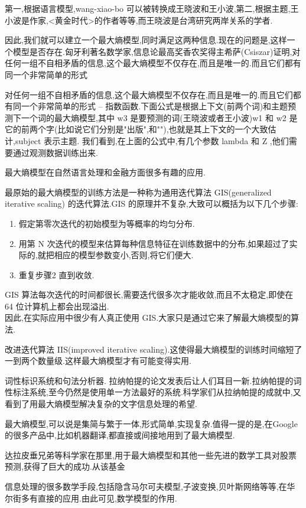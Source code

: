 \documentclass{article}
\begin{document}
第一,根据语言模型,wang-xiao-bo 可以被转换成王晓波和王小波,第二,根据主题,王小波是作家,<黄金时代>的作者等等,而王晓波是台湾研究两岸关系的学者.

因此,我们就可以建立一个最大熵模型,同时满足这两种信息.现在的问题是,这样一个模型是否存在.匈牙利著名数学家,信息论最高奖香农奖得主希萨(Csiszar)证明,对任何一组不自相矛盾的信息,这个最大熵模型不仅存在,而且是唯一的.而且它们都有同一个非常简单的形式

对任何一组不自相矛盾的信息,这个最大熵模型不仅存在,而且是唯一的.而且它们都有同一个非常简单的形式 -- 指数函数.下面公式是根据上下文(前两个词)和主题预测下一个词的最大熵模型,其中 w3 是要预测的词(王晓波或者王小波)w1 和 w2 是它的前两个字(比如说它们分别是"出版",和""),也就是其上下文的一个大致估计,subject 表示主题. 我们看到,在上面的公式中,有几个参数 lambda 和 Z ,他们需要通过观测数据训练出来.

最大熵模型在自然语言处理和金融方面很多有趣的应用.

最原始的最大熵模型的训练方法是一种称为通用迭代算法 GIS(generalized iterative scaling) 的迭代算法.GIS 的原理并不复杂,大致可以概括为以下几个步骤: 
\begin{enumerate}
\item 假定第零次迭代的初始模型为等概率的均匀分布. 
\item 用第 N 次迭代的模型来估算每种信息特征在训练数据中的分布,如果超过了实际的,就把相应的模型参数变小,否则,将它们便大. 
\item 重复步骤2 直到收敛.
\end{enumerate}

GIS 算法每次迭代的时间都很长,需要迭代很多次才能收敛,而且不太稳定,即使在 64 位计算机上都会出现溢出.\\
因此,在实际应用中很少有人真正使用 GIS.大家只是通过它来了解最大熵模型的算法.

改进迭代算法 IIS(improved iterative scaling).这使得最大熵模型的训练时间缩短了一到两个数量级.这样最大熵模型才有可能变得实用.

词性标识系统和句法分析器.
拉纳帕提的论文发表后让人们耳目一新.拉纳帕提的词性标注系统,至今仍然是使用单一方法最好的系统.科学家们从拉纳帕提的成就中,又看到了用最大熵模型解决复杂的文字信息处理的希望.

最大熵模型,可以说是集简与繁于一体,形式简单,实现复杂.值得一提的是,在Google的很多产品中,比如机器翻译,都直接或间接地用到了最大熵模型.

达拉皮垂兄弟等科学家在那里,用于最大熵模型和其他一些先进的数学工具对股票预测,获得了巨大的成功.从该基金

信息处理的很多数学手段,包括隐含马尔可夫模型,子波变换,贝叶斯网络等等,在华尔街多有直接的应用.由此可见,数学模型的作用.
\end{document}
